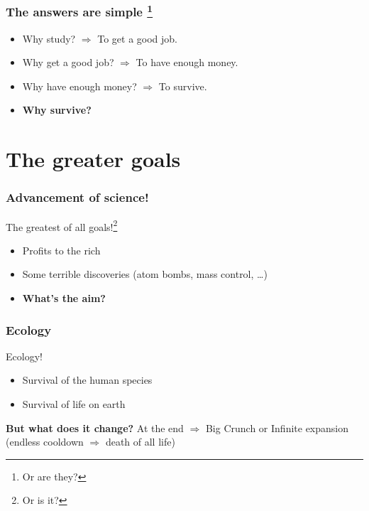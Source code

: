\documentclass{beamer}
\begin{document}
    \begin{frame}
    		\frametitle{The answers are simple \footnote{Or are they?}}
    		
		\begin{itemize}[<+->]
			\item Why study? $\Rightarrow$ To get a good job.
			\item Why get a good job? $\Rightarrow$ To have enough money.
			\item Why have enough money? $\Rightarrow$ To survive.
			\item \textbf{Why survive?}
		\end{itemize}		    		
    \end{frame}
    
	\section{The greater goals}    
    
    \begin{frame}
    		\frametitle{Advancement of science!}
    		
    		The greatest of all goals!\footnote{Or is it?}
    		\begin{itemize}[<+->]
    			\item Profits to the rich
    			\item Some terrible discoveries (atom bombs, mass control, \dots)
    			\item \textbf{What's the aim?}
    		\end{itemize}
    \end{frame}
    
    \begin{frame}
    		\frametitle{Ecology}
    		
    		Ecology!
    		\begin{itemize}[<+->]
    			\item Survival of the human species 
    			\item Survival of life on earth
    		\end{itemize}
    		
			\pause
    		
    		\textbf{But what does it change?} At the end $\Rightarrow$ Big Crunch or Infinite expansion (endless cooldown $\Rightarrow$ death of all life)
    		
    		
    \end{frame}
    
\end{document}
